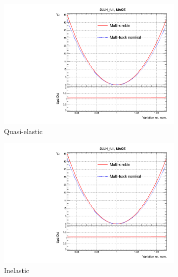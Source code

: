 \begin{figure}[h]
	\centering
	\begin{subfigure}[t]{0.32\textwidth}
		\includegraphics[width=\textwidth,page=7, trim={0mm 0mm 0mm 9mm}, clip]{figures/mach3/2018/llh/MultiPi_vs_MultiTrack_TotalLLH}
		\caption{Quasi-elastic}
	\end{subfigure}
	\begin{subfigure}[t]{0.32\textwidth}
		\includegraphics[width=\textwidth,page=9, trim={0mm 0mm 0mm 9mm}, clip]{figures/mach3/2018/llh/MultiPi_vs_MultiTrack_TotalLLH}
		\caption{Inelastic}
	\end{subfigure}
	\begin{subfigure}[t]{0.32\textwidth}

\end{subfigure}
\end{figure}
